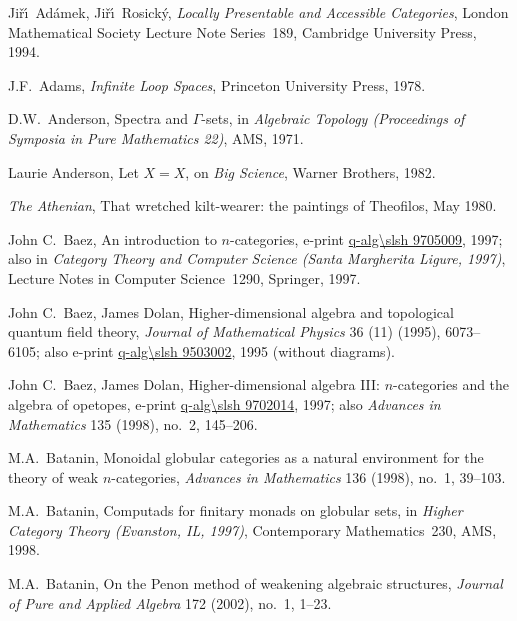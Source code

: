 
\begin{thebibliography}{c9999}


\small

Ji\v{r}\'\i\ Ad\'amek, Ji\v{r}\'\i\ Rosick\'y,
\emph{Locally Presentable and Accessible Categories},
London Mathematical Society Lecture Note Series~189,
Cambridge University Press, 1994.

J.F.~Adams, 
\emph{Infinite Loop Spaces},
Princeton University Press, 1978.

D.W.~Anderson,
Spectra and $\Gamma$-sets,
in \emph{Algebraic Topology (Proceedings of Symposia in Pure Mathematics
22)}, AMS, 1971.  

Laurie Anderson, 
Let $X=X$, 
on \emph{Big Science}, Warner Brothers, 1982.

\emph{The Athenian}, That wretched kilt-wearer: the paintings of Theofilos,
May 1980.

John C.~Baez,
An introduction to $n$-categories,
e-print \url{q-alg\slsh 9705009}, 1997;
also in 
\emph{Category Theory and Computer Science (Santa Margherita Ligure,
1997)},
Lecture Notes in Computer Science~1290,
Springer, 1997.

John C.~Baez, James Dolan,
Higher-dimensional algebra and topological quantum field theory,
\emph{Journal of Mathematical Physics} 36 (11) (1995), 6073--6105;
also e-print \url{q-alg\slsh 9503002}, 1995 (without diagrams).

John C.~Baez, James Dolan,
Higher-dimensional algebra III: $n$-categories and the algebra of opetopes,
e-print \url{q-alg\slsh 9702014}, 1997;
also 
\emph{Advances in Mathematics} 135 (1998), no.~2, 145--206.

M.A.~Batanin,  
Monoidal globular categories as a natural environment for the theory of weak
$n$-categories, 
\emph{Advances in Mathematics} 136 (1998), no.~1, 39--103.

M.A.~Batanin,
Computads for finitary monads on globular sets,
in
\emph{Higher Category Theory (Evanston, IL, 1997)},
Contemporary Mathematics~230, 
AMS, 1998.

M.A.~Batanin,  
On the Penon method of weakening algebraic structures, 
\emph{Journal of Pure and Applied Algebra} 172 (2002), no.~1, 1--23.


\end{thebibliography}
